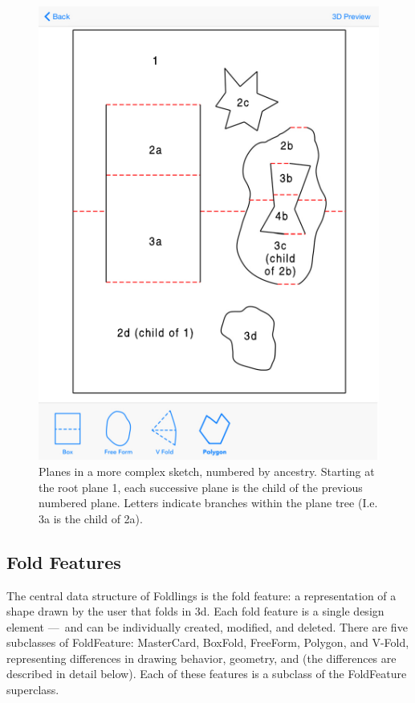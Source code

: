 \begin{figure}[htbp]
\centering
\includegraphics{figures/33_UI_Interface_Data_Structures/complex_sketch.pdf}
\caption{Planes in a more complex sketch, numbered by ancestry. Starting
at the root plane 1, each successive plane is the child of the previous
numbered plane. Letters indicate branches within the plane tree (I.e. 3a
is the child of 2a).}
\end{figure}

\subsection{Fold Features}\label{fold-features}

The central data structure of Foldlings is the fold feature: a
representation of a shape drawn by the user that folds in 3d. Each fold
feature is a single design element ---~and can be individually created,
modified, and deleted. There are five subclasses of FoldFeature:
MasterCard, BoxFold, FreeForm, Polygon, and V-Fold, representing
differences in drawing behavior, geometry, and (the differences are
described in detail below). Each of these features is a subclass of the
FoldFeature superclass.

